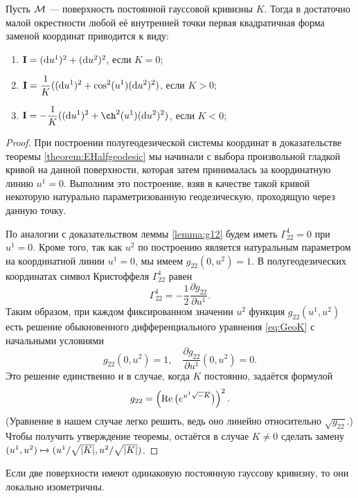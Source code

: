 \begin{theorem}
	Пусть $\mathcal{M}$ --- поверхность постоянной гауссовой кривизны $K$. Тогда в достаточно малой окрестности любой её внутренней точки первая квадратичная форма заменой координат приводится к виду:
	\begin{enumerate}[nolistsep, label=(\arabic*)]
		\item $\boldsymbol{\operatorname{I}} = (\mathop{}\!\mathrm{d} u^1)^2 + (\mathop{}\!\mathrm{d} u^2)^2$, если $K = 0$;
		\item $\displaystyle\boldsymbol{\operatorname{I}} = \frac{1}{K}((\mathop{}\!\mathrm{d} u^1)^2 + \cos^2(u^1)(\mathop{}\!\mathrm{d} u^2)^2)$, если $K > 0$;
		\item $\ds\I = -\frac{1}{K}((\d u^1)^2 + \ch^2(u^1)(\d u^2)^2)$, если $K < 0$;
	\end{enumerate}
\end{theorem}

\begin{proof}
	При построении полугеодезической системы координат в доказательстве теоремы \ref{theorem:EHalfgeodesic} мы начинали с выбора произвольной гладкой кривой на данной поверхности, которая затем принималась за координатную линию $u^1 = 0$. Выполним это построение, взяв в качестве такой кривой некоторую натурально параметризованную геодезическую, проходящую через данную точку.

	По аналогии с доказательством леммы \ref{lemma:g12} будем иметь $\Gamma_{22}^1 = 0$ при $u^1 = 0$. Кроме того, так как $u^2$ по построению является натуральным параметром на координатной линии $u^1 = 0$, мы имеем $g_{22}(0, u^2) = 1$. В полугеодезических координатах символ Кристоффеля $\Gamma_{22}^1$ равен
	\[
		\Gamma_{22}^1 = -\frac{1}{2}\frac{\partial g_{22}}{\partial u^1}.
	\]
	Таким образом, при каждом фиксированном значении $u^2$ функция $g_{22}(u^1, u^2)$ есть решение обыкновенного дифференциального уравнения \eqref{eq:GeoK} с начальными условиями
	\[
		g_{22}(0, u^2) = 1,\quad\frac{\partial g_{22}}{\partial u^1}(0, u^2) = 0.
	\]
	Это решение единственно и в случае, когда $K$ постоянно, задаётся формулой
	\[
		g_{22} = \left(\operatorname{Re}\big(e^{u^1\sqrt{-K}}\big)\right)^2.
	\]
	(Уравнение в нашем случае легко решить, ведь оно линейно относительно $\sqrt{g_{22}}$.) Чтобы получить утверждение теоремы, остаётся в случае $K \ne 0$ сделать замену $(u^1, u^2) \hm\mapsto (u^1 / \sqrt{\abs{K}}, u^2 / \sqrt{\abs{K}})$.
\end{proof}

\begin{corollary}
	Если две поверхности имеют одинаковую постоянную гауссову кривизну, то они локально изометричны.
\end{corollary}


